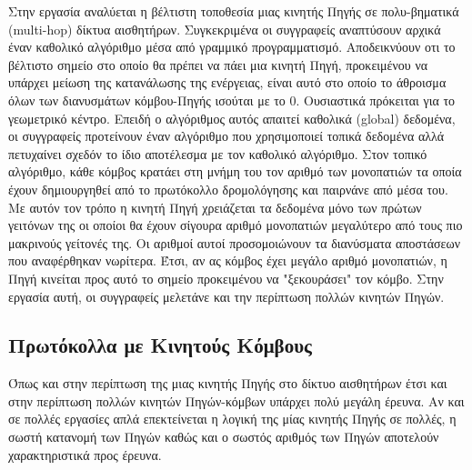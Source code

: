 Στην εργασία \cite{deploying_multiple_sinks_wsns} αναλύεται η βέλτιστη τοποθεσία μιας κινητής Πηγής σε πολυ-βηματικά (multi-hop) δίκτυα αισθητήρων. Συγκεκριμένα οι
συγγραφείς αναπτύσουν αρχικά έναν καθολικό αλγόριθμο μέσα από γραμμικό προγραμματισμό. Αποδεικνύουν οτι το βέλτιστο σημείο στο οποίο θα πρέπει να πάει μια κινητή
Πηγή, προκειμένου να υπάρχει μείωση της κατανάλωσης της ενέργειας, είναι αυτό στο οποίο το άθροισμα όλων των διανυσμάτων κόμβου-Πηγής ισούται με το 0. Ουσιαστικά
πρόκειται για το γεωμετρικό κέντρο. Επειδή ο αλγόριθμος αυτός απαιτεί καθολικά (global) δεδομένα, οι συγγραφείς προτείνουν έναν αλγόριθμο που χρησιμοποιεί τοπικά
δεδομένα αλλά πετυχαίνει σχεδόν το ίδιο αποτέλεσμα με τον καθολικό αλγόριθμο. Στον τοπικό αλγόριθμο, κάθε κόμβος κρατάει στη μνήμη του τον αριθμό των μονοπατιών τα
οποία έχουν δημιουργηθεί από το πρωτόκολλο δρομολόγησης και παιρνάνε από μέσα του. Με αυτόν τον τρόπο η κινητή Πηγή χρειάζεται τα δεδομένα μόνο των πρώτων γειτόνων
της οι οποίοι θα έχουν σίγουρα αριθμό μονοπατιών μεγαλύτερο από τους πιο μακρινούς γείτονές της. Οι αριθμοί αυτοί προσομοιώνουν τα διανύσματα αποστάσεων που
αναφέρθηκαν νωρίτερα. Έτσι, αν ας κόμβος έχει μεγάλο αριθμό μονοπατιών, η Πηγή κινείται προς αυτό το σημείο προκειμένου να "ξεκουράσει" τον κόμβο. Στην εργασία αυτή,
οι συγγραφείς μελετάνε και την περίπτωση πολλών κινητών Πηγών.

\subsection{Πρωτόκολλα με Κινητούς Κόμβους} %
Όπως και στην περίπτωση της μιας κινητής Πηγής στο δίκτυο αισθητήρων έτσι και στην περίπτωση πολλών κινητών Πηγών-κόμβων υπάρχει πολύ μεγάλη έρευνα. Αν και σε πολλές
εργασίες απλά επεκτείνεται η λογική της μίας κινητής Πηγής σε πολλές, η σωστή κατανομή των Πηγών καθώς και ο σωστός αριθμός των Πηγών αποτελούν χαρακτηριστικά προς
έρευνα.

